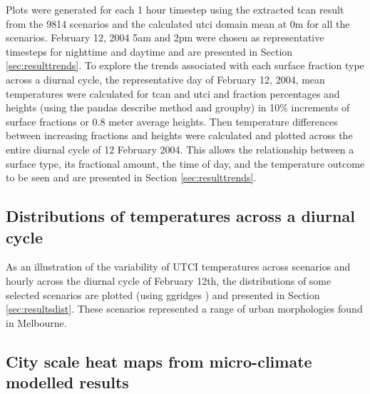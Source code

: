 \documentclass[final,3p,times,authoryear]{elsarticle}
\begin{document}
Plots were generated for each 1 hour timestep using the extracted \gls{tcan} result from the 9814 scenarios and the calculated \gls{utci} domain mean at 0m for all the scenarios. February 12, 2004 5am and 2pm were chosen as representative timesteps for nighttime and daytime and are presented in Section \ref{sec:resulttrends}. To explore the trends associated with each surface fraction type across a diurnal cycle, the representative day of February 12, 2004, mean temperatures were calculated for \gls{tcan} and \gls{utci} and fraction percentages and heights (using the pandas \citep{reback2020pandas} describe method and groupby) in 10\% increments of surface fractions or 0.8 meter average heights. Then temperature differences between increasing fractions and heights were calculated and plotted across the entire diurnal cycle of 12 February 2004. This allows the relationship between a surface type, its fractional amount, the time of day, and the temperature outcome to be seen and are presented in Section \ref{sec:resulttrends}.



\subsection{Distributions of temperatures across a diurnal cycle}\label{sec:methodsdist}
%
% 

As an illustration of the variability of UTCI temperatures across scenarios and hourly across the diurnal cycle of February 12th, the distributions of some selected scenarios are plotted (using ggridges \citep{ggridges}) and presented in Section \ref{sec:resultsdist}. These scenarios represented a range of urban morphologies found in Melbourne.


\subsection{City scale heat maps from micro-climate modelled results}\label{sec:methodsheatmaps}
\end{document}
